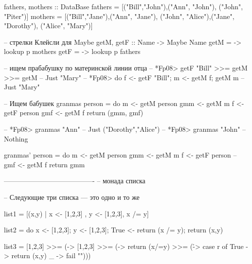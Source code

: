 fathers, mothers :: DataBase
fathers = [("Bill","John"),("Ann", "John"), ("John", "Piter")]
mothers = [("Bill","Jane"),("Ann", "Jane"), ("John", "Alice"),("Jane", "Dorothy"), ("Alice", "Mary")]

-- стрелки Клейсли для Maybe
getM, getF :: Name -> Maybe Name
getM = \p -> lookup p mothers
getF = \p -> lookup p fathers

-- ищем прабабушку по материнской линии отца
-- *Fp08> getF "Bill" >>= getM >>= getM
-- Just "Mary"
-- *Fp08> do {f <- getF "Bill"; m <- getM f; getM m}
-- Just "Mary"

-- Ищем бабушек
granmas person = do
  m   <- getM person
  gmm <- getM m
  f   <- getF person
  gmf <- getM f
  return (gmm, gmf)

-- *Fp08> granmas "Ann"
-- Just ("Dorothy","Alice")
-- *Fp08> granmas "John"
-- Nothing

granmas' person = do
  m   <- getM person
  gmm <- getM m
  f   <- getF person
--  gmf <- getM f
  return gmm



----------------------------------------
-- монада списка

-- Следующие три списка --- это одно и то же

list1 = [(x,y) | x <- [1,2,3] , y <- [1,2,3], x /= y]

list2 = do 
   x <- [1,2,3]; 
   y <- [1,2,3]; 
   True <- return (x /= y); 
   return (x,y)

list3 = 
  [1,2,3] >>= (\x -> 
  [1,2,3] >>= (\y -> 
  return (x/=y) >>= (\r -> 
  case r of True -> return (x,y)
            _    -> fail "")))





